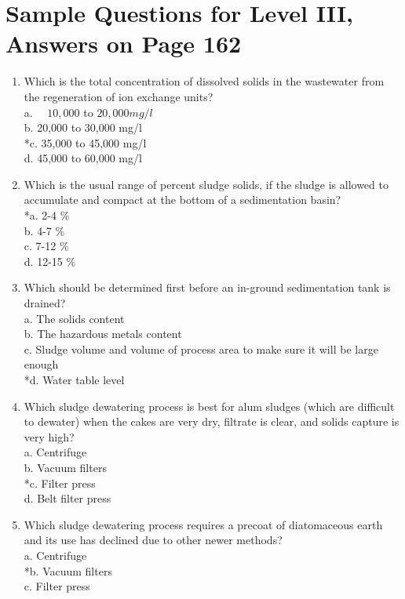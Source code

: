 \section{Sample Questions for Level III, Answers on Page 162}
\begin{enumerate}[label=TIII-\arabic*]
  \item Which is the total concentration of dissolved solids in the wastewater from the regeneration of ion exchange units?\\
a. $\quad 10,000$ to $20,000 mg/l$\\
b. 20,000 to 30,000 mg/l\\
*c. 35,000 to 45,000 mg/l\\
d. 45,000 to 60,000 mg/l\\
  \item Which is the usual range of percent sludge solids, if the sludge is allowed to accumulate and compact at the bottom of a sedimentation basin?\\
*a. 2-4 \%\\
b. 4-7 \%\\
c. 7-12 \%\\
d. 12-15 \% \\
\item Which should be determined first before an in-ground sedimentation tank is drained?\\
a. The solids content\\
b. The hazardous metals content\\
c. Sludge volume and volume of process area to make sure it will be large enough\\
*d. Water table level\\
  \item Which sludge dewatering process is best for alum sludges (which are difficult to dewater) when the cakes are very dry, filtrate is clear, and solids capture is very high?\\
a. Centrifuge\\
b. Vacuum filters\\
*c. Filter press\\
d. Belt filter press\\
  \item Which sludge dewatering process requires a precoat of diatomaceous earth and its use has declined due to other newer methods?\\
a. Centrifuge\\
*b. Vacuum filters\\
c. Filter press\\

\end{enumerate}
